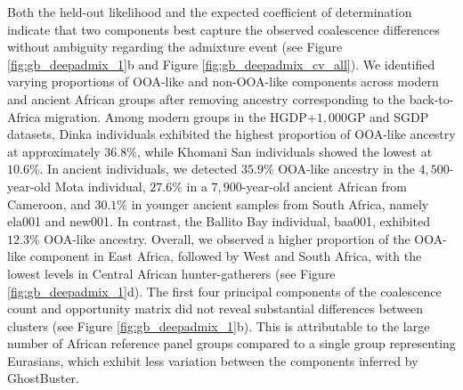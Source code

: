 Both the held-out likelihood and the expected coefficient of determination indicate that two components best capture the observed coalescence differences without ambiguity regarding the admixture event (see Figure \ref{fig:gb_deepadmix_1}b and Figure \ref{fig:gb_deepadmix_cv_all}). We identified varying proportions of OOA-like and non-OOA-like components across modern and ancient African groups after removing ancestry corresponding to the back-to-Africa migration. Among modern groups in the HGDP+$1{,}000$GP and SGDP datasets, Dinka individuals exhibited the highest proportion of OOA-like ancestry at approximately $36.8$\%, while Khomani San individuals showed the lowest at $10.6$\%. In ancient individuals, we detected $35.9\%$ OOA-like ancestry in the $4{,}500$-year-old Mota individual, $27.6\%$ in a $7{,}900$-year-old ancient African from Cameroon, and $30.1\%$ in younger ancient samples from South Africa, namely ela001 and new001. In contrast, the Ballito Bay individual, baa001, exhibited $12.3\%$ OOA-like ancestry. Overall, we observed a higher proportion of the OOA-like component in East Africa, followed by West and South Africa, with the lowest levels in Central African hunter-gatherers (see Figure \ref{fig:gb_deepadmix_1}d). The first four principal components of the coalescence count and opportunity matrix did not reveal substantial differences between clusters (see Figure \ref{fig:gb_deepadmix_1}b). This is attributable to the large number of African reference panel groups compared to a single group representing Eurasians, which exhibit less variation between the components inferred by GhostBuster.


